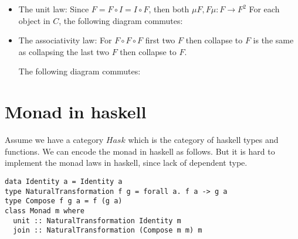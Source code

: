 \documentclass{paper}
\begin{document}
\begin{itemize}
  \item The unit law:
  Since $F = F \circ I = I \circ F$,
  then both $\mu F, F \mu : F \to F^2$
  For each object in $C$, the following diagram commutes:


  \item The associativity law:
  For $F\circ F\circ F$ first two $F$ then collapse to $F$
  is the same as collapsing the last two $F$ then collapse to $F$.

  The following diagram commutes:

\end{itemize}

\pagebreak
\section*{Monad in haskell}
Assume we have a category $Hask$ which is the category of haskell types and functions.
We can encode the monad in haskell as follows. But it is hard to implement the monad laws in haskell,
since lack of dependent type.

\begin{verbatim}
data Identity a = Identity a
type NaturalTransformation f g = forall a. f a -> g a
type Compose f g a = f (g a)
class Monad m where
  unit :: NaturalTransformation Identity m
  join :: NaturalTransformation (Compose m m) m
\end{verbatim}
\end{document}
